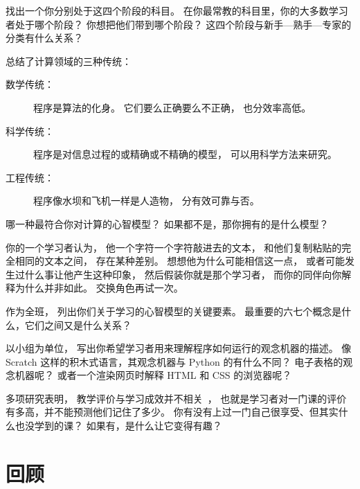 找出一个你分别处于这四个阶段的科目。
在你最常教的科目里，你的大多数学习者处于哪个阶段？
你想把他们带到哪个阶段？
这四个阶段与新手—熟手—专家的分类有什么关系？


\cite{Tedr2008} 总结了计算领域的三种传统：

\begin{description}

\item[数学传统：]
  程序是算法的化身。
  它们要么正确要么不正确，
  也分效率高低。

\item[科学传统：]
  程序是对信息过程的或精确或不精确的模型，
  可以用科学方法来研究。

\item[工程传统：]
  程序像水坝和飞机一样是人造物，
  分有效可靠与否。

\end{description}

哪一种最符合你对计算的心智模型？
如果都不是，那你拥有的是什么模型？


你的一个学习者认为，
他一个字符一个字符敲进去的文本，
和他们复制粘贴的完全相同的文本之间，
存在某种差别。
想想他为什么可能相信这一点，
或者可能发生过什么事让他产生这种印象，
然后假装你就是那个学习者，
而你的同伴向你解释为什么并非如此。
交换角色再试一次。


作为全班，
列出你们关于学习的心智模型的关键要素。
最重要的六七个概念是什么，它们之间又是什么关系？


以小组为单位，
写出你希望学习者用来理解程序如何运行的观念机器的描述。
像 Scratch 这样的积木式语言，其观念机器与 Python 的有什么不同？
电子表格的观念机器呢？
或者一个渲染网页时解释 HTML 和 CSS 的浏览器呢？


多项研究表明，
教学评价与学习成效并不相关~\cite{Star2014,Uttl2017}，
也就是学习者对一门课的评价有多高，并不能预测他们记住了多少。
你有没有上过一门自己很享受、但其实什么也没学到的课？
如果有，是什么让它变得有趣？

\newpage
\section*{回顾}


